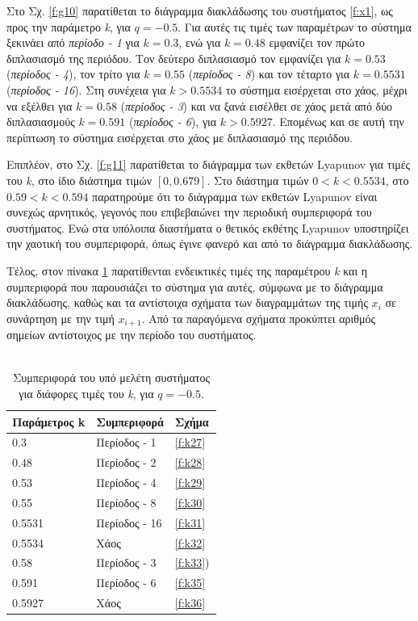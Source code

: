Στο Σχ. \ref{f:g10} παρατίθεται το διάγραμμα διακλάδωσης του συστήματος \ref{f:x1}, ως προς την παράμετρο \emph{k}, για $q =- 0.5$. Για αυτές τις τιμές των παραμέτρων το σύστημα ξεκινάει από \emph{περίοδο - 1} για $k=0.3$, ενώ για  $k=0.48$ εμφανίζει τον πρώτο διπλασιασμό της περιόδου. Τον δεύτερο διπλασιασμό τον εμφανίζει για $k=0.53$ (\emph{περίοδος -   4}), τον τρίτο για $k=0.55$  (\emph{περίοδος -   8}) και τον τέταρτο για $k=0.5531$ (\emph{περίοδος -   16}). Στη συνέχεια για $k>0.5534$ το σύστημα εισέρχεται στο χάος, μέχρι να εξέλθει για $k=0.58$ (\emph{περίοδος -   3}) και να ξανά εισέλθει σε χάος μετά από δύο διπλασιασμούς $k=0.591$ (\emph{περίοδος -   6}), για $k>0.5927$.
Επομένως και σε αυτή την περίπτωση το σύστημα εισέρχεται στο χάος με διπλασιασμό της περιόδου. 

Επιπλέον, στο Σχ. \ref{f:g11} παρατίθεται το διάγραμμα των εκθετών Lyapunov για τιμές του \emph{k}, στο ίδιο διάστημα τιμών $[0, 0.679]$.  Στο διάστημα τιμών $0<k<0.5534$, στο $0.59<k<0.594$ παρατηρούμε ότι το διάγραμμα των εκθετών Lyapunov είναι συνεχώς αρνητικός, γεγονός που επιβεβαιώνει την περιοδική συμπεριφορά του συστήματος. Ενώ στα υπόλοιπα διαστήματα ο θετικός εκθέτης Lyapunov υποστηρίζει την χαοτική του συμπεριφορά, όπως έγινε φανερό και από το διάγραμμα διακλάδωσης.

Τέλος, στον πίνακα \ref{tab:abc2} παρατίθενται ενδεικτικές τιμές της παραμέτρου \emph{k} και η συμπεριφορά που παρουσιάζει το σύστημα για αυτές, σύμφωνα με το διάγραμμα διακλάδωσης, καθώς και τα αντίστοιχα σχήματα των διαγραμμάτων της τιμής \(x_i\) σε συνάρτηση με την τιμή \(x_{i+1}\). Από τα παραγόμενα σχήματα προκύπτει αριθμός σημείων αντίστοιχος με την περίοδο του συστήματος.\\\\

\begin{table}[ht]
	\centering
	\caption{ Συμπεριφορά του υπό μελέτη συστήματος για διάφορες τιμές του \emph{k}, για $q=-0.5$.}
	\label{tab:abc2}
	\begin{tabular}{l | l | l}
		Παράμετρος k & Συμπεριφορά & Σχήμα\\
		\hline
		0.3 &  Περίοδος - 1 & \ref{f:k27}\\
		0.48& Περίοδος - 2 & \ref{f:k28}\\
		0.53& Περίοδος - 4 & \ref{f:k29}\\
		0.55 &  Περίοδος - 8 & \ref{f:k30}\\
		0.5531 & Περίοδος - 16 & \ref{f:k31}\ \\
		0.5534 & Χάος & \ref{f:k32}\\
		0.58 & Περίοδος - 3 & \ref{f:k33})\\
		0.591 & Περίοδος - 6 & \ref{f:k35}\\
		0.5927 & Χάος & \ref{f:k36}\\
	\end{tabular}
	
\end{table}

